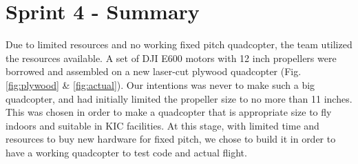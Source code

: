 \chapter{Sprint 4 - Summary}

Due to limited resources and no working fixed pitch quadcopter, the team utilized the resources available. A set of DJI E600 motors  with 12 inch propellers were borrowed and assembled on a new laser-cut plywood quadcopter (Fig. \ref{fig:plywood} \& \ref{fig:actual}). Our intentions was never to make such a big quadcopter, and had initially limited the propeller size to no more than 11 inches. This was chosen in order to make a quadcopter that is appropriate size to fly indoors and suitable in KIC facilities. At this stage, with limited time and resources to buy new hardware for fixed pitch, we chose to build it in order to have a working quadcopter to test code and actual flight.


